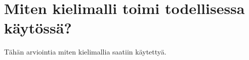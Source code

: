 \chapter{Miten kielimalli toimi todellisessa käytössä?}%
\label{ch:arviointi}

Tähän arviointia miten kielimallia saatiin käytettyä.
